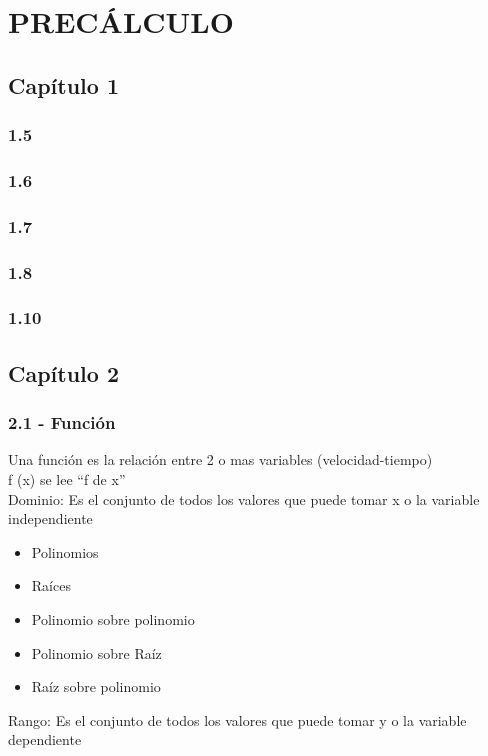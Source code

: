 \section{PRECÁLCULO}

\subsection{Capítulo 1}
\subsubsection{1.5}
\subsubsection{1.6}
\subsubsection{1.7}
\subsubsection{1.8}
\subsubsection{1.10}
\subsection{Capítulo 2}
\subsubsection{2.1 - Función}
Una función es la relación entre 2 o mas variables (velocidad-tiempo)\\
f (x) se lee “f de x”\\
Dominio: Es el conjunto de todos los valores que puede tomar x o la variable independiente\\
\begin{itemize}
	\item Polinomios
	\item Raíces
	\item Polinomio sobre polinomio
	\item Polinomio sobre Raíz
	\item Raíz sobre polinomio
\end{itemize}
Rango: Es el conjunto de todos los valores que puede tomar y o la variable dependiente 
